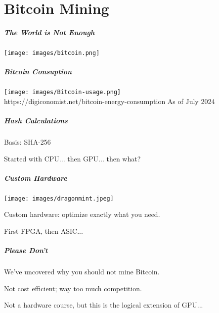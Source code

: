 \part{Bitcoin Mining}

\begin{frame}
\partpage
\end{frame}

\begin{frame}
\frametitle{The World is Not Enough}

\begin{center}
	\texttt{[image: images/bitcoin.png]}
\end{center}


\end{frame}


\begin{frame}
\frametitle{Bitcoin Consuption}

\begin{center}
	\texttt{[image: images/Bitcoin-usage.png]}\\
	\hfill https://digiconomist.net/bitcoin-energy-consumption As of July 2024
\end{center}


\end{frame}

\begin{frame}
\frametitle{Hash Calculations}

Basis: SHA-256

Started with CPU... then GPU... then what?


\end{frame}

\begin{frame}
\frametitle{Custom Hardware}

\begin{center}
	\texttt{[image: images/dragonmint.jpeg]}
\end{center}

Custom hardware: optimize exactly what you need.

First FPGA, then ASIC...

\end{frame}


\begin{frame}
\frametitle{Please Don't}

We've uncovered why you should not mine Bitcoin.

Not cost efficient; way too much competition.

Not a hardware course, but this is the logical extension of GPU...

\end{frame}

